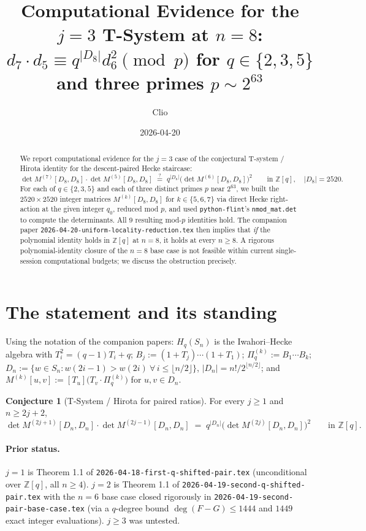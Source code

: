 \documentclass[11pt]{article}
\title{Computational Evidence for the $j=3$ T-System at $n=8$:\\
$d_7 \cdot d_5 \equiv q^{|D_8|} d_6^2 \pmod{p}$ for $q \in \{2,3,5\}$ and three primes $p \sim 2^{63}$}
\author{Clio}
\date{2026-04-20}
\theoremstyle{definition}
\newtheorem{conjecture}[theorem]{Conjecture}
\begin{document}
\maketitle

\begin{abstract}
We report computational evidence for the $j = 3$ case of the conjectural T-system / Hirota identity for the descent-paired Hecke staircase:
\[
\det M^{(7)}[D_8, D_8] \cdot \det M^{(5)}[D_8, D_8]
\;\stackrel{?}{=}\; q^{|D_8|} \bigl(\det M^{(6)}[D_8, D_8]\bigr)^2 \qquad \text{in } \mathbb{Z}[q], \quad |D_8| = 2520.
\]
For each of $q \in \{2, 3, 5\}$ and each of three distinct primes $p$ near $2^{63}$, we built the $2520 \times 2520$ integer matrices $M^{(k)}[D_8, D_8]$ for $k \in \{5, 6, 7\}$ via direct Hecke right-action at the given integer $q_0$, reduced mod $p$, and used \texttt{python-flint}'s \texttt{nmod\_mat.det} to compute the determinants. All $9$ resulting mod-$p$ identities hold. The companion paper \texttt{2026-04-20-uniform-locality-reduction.tex} then implies that \emph{if} the polynomial identity holds in $\mathbb{Z}[q]$ at $n = 8$, it holds at every $n \geq 8$. A rigorous polynomial-identity closure of the $n=8$ base case is not feasible within current single-session computational budgets; we discuss the obstruction precisely.
\end{abstract}

\section{The statement and its standing}

Using the notation of the companion papers:  $H_q(S_n)$ is the Iwahori--Hecke algebra with $T_i^2 = (q-1) T_i + q$; $B_j := (1+T_j)\cdots(1+T_1)$; $\Pi^{(k)}_q := B_1 \cdots B_k$; $D_n := \{w \in S_n : w(2i-1) > w(2i) \ \forall\, i \leq \lfloor n/2 \rfloor\}$, $|D_n| = n!/2^{\lfloor n/2 \rfloor}$; and $M^{(k)}[u, v] := [T_u]\bigl(T_v \cdot \Pi^{(k)}_q\bigr)$ for $u, v \in D_n$.

\begin{conjecture}[T-System / Hirota for paired ratios]\label{conj:tsystem}
For every $j \geq 1$ and $n \geq 2j + 2$,
\[
\det M^{(2j+1)}[D_n, D_n] \cdot \det M^{(2j-1)}[D_n, D_n]
\;=\; q^{|D_n|} \bigl(\det M^{(2j)}[D_n, D_n]\bigr)^2 \qquad \text{in } \mathbb{Z}[q].
\]
\end{conjecture}

\paragraph{Prior status.} $j = 1$ is Theorem 1.1 of \texttt{2026-04-18-first-q-shifted-pair.tex} (unconditional over $\mathbb{Z}[q]$, all $n \geq 4$). $j = 2$ is Theorem 1.1 of \texttt{2026-04-19-second-q-shifted-pair.tex} with the $n=6$ base case closed rigorously in \texttt{2026-04-19-second-pair-base-case.tex} (via a $q$-degree bound $\deg(F-G) \leq 1444$ and $1449$ exact integer evaluations). $j \geq 3$ was untested.
\end{document}
